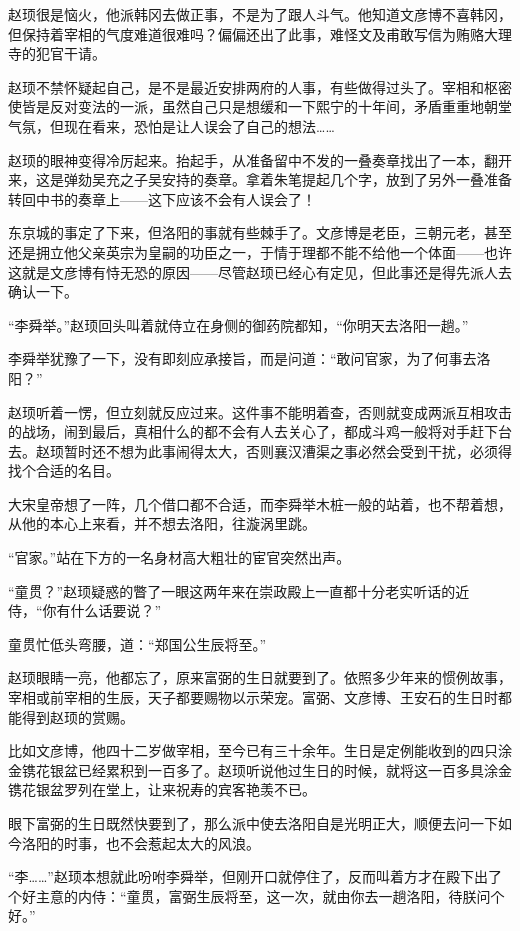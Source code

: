 赵顼很是恼火，他派韩冈去做正事，不是为了跟人斗气。他知道文彦博不喜韩冈，但保持着宰相的气度难道很难吗？偏偏还出了此事，难怪文及甫敢写信为贿赂大理寺的犯官干请。

赵顼不禁怀疑起自己，是不是最近安排两府的人事，有些做得过头了。宰相和枢密使皆是反对变法的一派，虽然自己只是想缓和一下熙宁的十年间，矛盾重重地朝堂气氛，但现在看来，恐怕是让人误会了自己的想法……

赵顼的眼神变得冷厉起来。抬起手，从准备留中不发的一叠奏章找出了一本，翻开来，这是弹劾吴充之子吴安持的奏章。拿着朱笔提起几个字，放到了另外一叠准备转回中书的奏章上——这下应该不会有人误会了！

东京城的事定了下来，但洛阳的事就有些棘手了。文彦博是老臣，三朝元老，甚至还是拥立他父亲英宗为皇嗣的功臣之一，于情于理都不能不给他一个体面——也许这就是文彦博有恃无恐的原因——尽管赵顼已经心有定见，但此事还是得先派人去确认一下。

“李舜举。”赵顼回头叫着就侍立在身侧的御药院都知，“你明天去洛阳一趟。”

李舜举犹豫了一下，没有即刻应承接旨，而是问道：“敢问官家，为了何事去洛阳？”

赵顼听着一愣，但立刻就反应过来。这件事不能明着查，否则就变成两派互相攻击的战场，闹到最后，真相什么的都不会有人去关心了，都成斗鸡一般将对手赶下台去。赵顼暂时还不想为此事闹得太大，否则襄汉漕渠之事必然会受到干扰，必须得找个合适的名目。

大宋皇帝想了一阵，几个借口都不合适，而李舜举木桩一般的站着，也不帮着想，从他的本心上来看，并不想去洛阳，往漩涡里跳。

“官家。”站在下方的一名身材高大粗壮的宦官突然出声。

“童贯？”赵顼疑惑的瞥了一眼这两年来在崇政殿上一直都十分老实听话的近侍，“你有什么话要说？”

童贯忙低头弯腰，道：“郑国公生辰将至。”

赵顼眼睛一亮，他都忘了，原来富弼的生日就要到了。依照多少年来的惯例故事，宰相或前宰相的生辰，天子都要赐物以示荣宠。富弼、文彦博、王安石的生日时都能得到赵顼的赏赐。

比如文彦博，他四十二岁做宰相，至今已有三十余年。生日是定例能收到的四只涂金镌花银盆已经累积到一百多了。赵顼听说他过生日的时候，就将这一百多具涂金镌花银盆罗列在堂上，让来祝寿的宾客艳羡不已。

眼下富弼的生日既然快要到了，那么派中使去洛阳自是光明正大，顺便去问一下如今洛阳的时事，也不会惹起太大的风浪。

“李……”赵顼本想就此吩咐李舜举，但刚开口就停住了，反而叫着方才在殿下出了个好主意的内侍：“童贯，富弼生辰将至，这一次，就由你去一趟洛阳，待朕问个好。”

